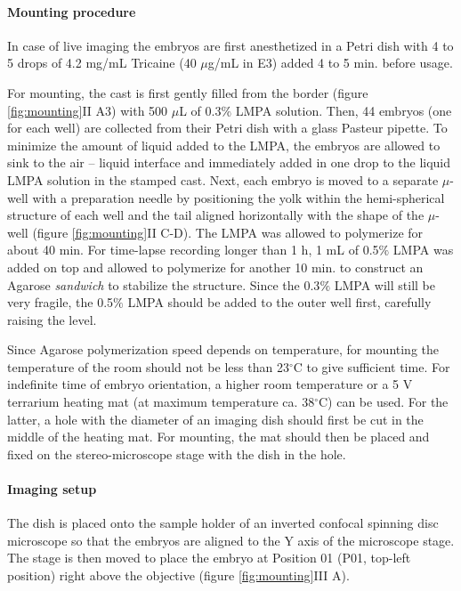 \documentclass[10pt, b5paper, singlespacinge, twoside]{reedthesis} %
\theoremstyle{definition}
\theoremstyle{definition}
\theoremstyle{definition}
\theoremstyle{remark}
\begin{document}
\hypertarget{mounting-procedure}{%
\paragraph{Mounting procedure}\label{mounting-procedure}}

In case of live imaging the embryos are first anesthetized in a Petri dish with 4 to 5 drops of 4.2 mg/mL Tricaine (40 \(\mu\)g/mL in E3) added 4 to 5 min. before usage.

For mounting, the cast is first gently filled from the border (figure \ref{fig:mounting}II A3) with 500 \(\mu\)L of 0.3\(\%\) LMPA solution. Then, 44 embryos (one for each well) are collected from their Petri dish with a glass Pasteur pipette. To minimize the amount of liquid added to the LMPA, the embryos are allowed to sink to the air -- liquid interface and immediately added in one drop to the liquid LMPA solution in the stamped cast. Next, each embryo is moved to a separate \(\mu\)-well with a preparation needle by positioning the yolk within the hemi-spherical structure of each well and the tail aligned horizontally with the shape of the \(\mu\)-well (figure \ref{fig:mounting}II C-D). The LMPA was allowed to polymerize for about 40 min. For time-lapse recording longer than 1 h, 1 mL of 0.5\(\%\) LMPA was added on top and allowed to polymerize for another 10 min. to construct an Agarose \emph{sandwich} to stabilize the structure. Since the 0.3\(\%\) LMPA will still be very fragile, the 0.5\(\%\) LMPA should be added to the outer well first, carefully raising the level.

Since Agarose polymerization speed depends on temperature, for mounting the temperature of the room should not be less than 23\(^\circ\)C to give sufficient time. For indefinite time of embryo orientation, a higher room temperature or a 5 V terrarium heating mat (at maximum temperature ca. 38\(^\circ\)C) can be used. For the latter, a hole with the diameter of an imaging dish should first be cut in the middle of the heating mat. For mounting, the mat should then be placed and fixed on the stereo-microscope stage with the dish in the hole.

\hypertarget{imaging-setup}{%
\paragraph{Imaging setup}\label{imaging-setup}}

The dish is placed onto the sample holder of an inverted confocal spinning disc microscope so that the embryos are aligned to the Y axis of the microscope stage. The stage is then moved to place the embryo at Position 01 (P01, top-left position) right above the objective (figure \ref{fig:mounting}III A).
\end{document}
